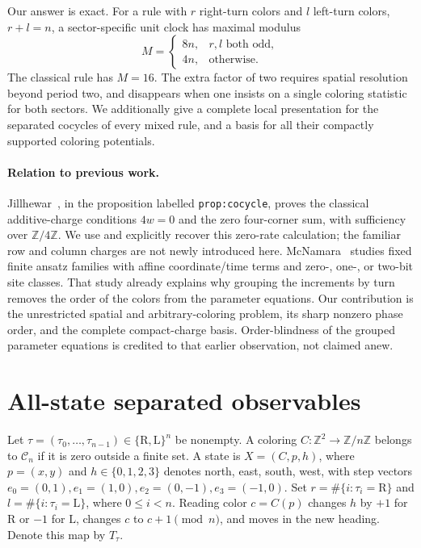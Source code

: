 \documentclass[11pt]{article}
\theoremstyle{definition}
\newcommand{\Z}{\mathbb Z}
\newcommand{\R}{\mathrm R}
\newcommand{\Lturn}{\mathrm L}
\newcommand{\tape}{\mathcal C_n}
\begin{document}
Our answer is exact. For a rule with $r$ right-turn colors and $l$ left-turn
colors, $r+l=n$, a sector-specific unit clock has maximal modulus
\begin{equation}\label{eq:mainM}
 M=\begin{cases}8n,&r,l\text{ both odd},\\4n,&\text{otherwise}.
 \end{cases}
\end{equation}
The classical rule has $M=16$. The extra factor of two requires spatial
resolution beyond period two, and disappears when one insists on a single
coloring statistic for both sectors. We additionally give a complete local
presentation for the separated cocycles of every mixed rule, and a basis for
all their compactly supported coloring potentials.

\paragraph{Relation to previous work.}
Jillhewar~\cite{jillhewar}, in the proposition labelled \texttt{prop:cocycle},
proves the classical additive-charge conditions $4w=0$ and the zero four-corner
sum, with sufficiency over $\Z/4\Z$. We use and explicitly recover this
zero-rate calculation; the familiar row and column charges are not newly
introduced here. McNamara~\cite{mcnamara} studies fixed finite ansatz families
with affine coordinate/time terms and zero-, one-, or two-bit site classes.
That study already explains why grouping the increments by turn removes the
order of the colors from the parameter equations. Our contribution is the
unrestricted spatial and arbitrary-coloring problem, its sharp nonzero phase
order, and the complete compact-charge basis. Order-blindness of the grouped
parameter equations is credited to that earlier observation, not claimed anew.

\section{All-state separated observables}
Let $\tau=(\tau_0,\ldots,\tau_{n-1})\in\{\R,\Lturn\}^n$ be nonempty. A
coloring $C:\Z^2\to\Z/n\Z$ belongs to $\tape$ if it is zero outside a finite
set. A state is $X=(C,p,h)$, where $p=(x,y)$ and $h\in\{0,1,2,3\}$ denotes
north, east, south, west, with step vectors
$e_0=(0,1),e_1=(1,0),e_2=(0,-1),e_3=(-1,0)$.
Set $r=\#\{i:\tau_i=\R\}$ and $l=\#\{i:\tau_i=\Lturn\}$,
where $0\le i<n$. Reading color $c=C(p)$ changes $h$ by $+1$ for $\R$ or
$-1$ for $\Lturn$, changes $c$ to $c+1\pmod n$, and moves in the new heading.
Denote this map by $T_\tau$.
\end{document}
